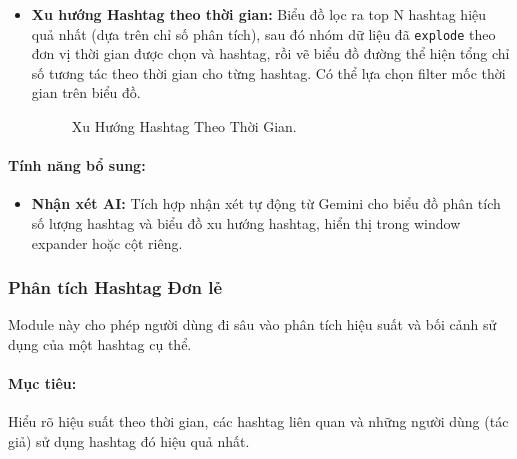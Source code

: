 \begin{itemize}
        \item \textbf{Xu hướng Hashtag theo thời gian:} Biểu đồ lọc ra top N hashtag hiệu quả nhất (dựa trên chỉ số phân tích), sau đó nhóm dữ liệu đã \texttt{explode} theo đơn vị thời gian được chọn và hashtag, rồi vẽ biểu đồ đường thể hiện tổng chỉ số tương tác theo thời gian cho từng hashtag. Có thể lựa chọn filter mốc thời gian trên biểu đồ.
        \begin{figure}[H]
            \centering
            \caption{Xu Hướng Hashtag Theo Thời Gian.}
        \end{figure}
    \end{itemize}

\paragraph{Tính năng bổ sung:}
    \begin{itemize}
        \item \textbf{Nhận xét AI:} Tích hợp nhận xét tự động từ Gemini cho biểu đồ phân tích số lượng hashtag và biểu đồ xu hướng hashtag, hiển thị trong window expander hoặc cột riêng.
    \end{itemize}


\subsubsection{Phân tích Hashtag Đơn lẻ}

Module này cho phép người dùng đi sâu vào phân tích hiệu suất và bối cảnh sử dụng của một hashtag cụ thể.

\paragraph{Mục tiêu:} Hiểu rõ hiệu suất theo thời gian, các hashtag liên quan và những người dùng (tác giả) sử dụng hashtag đó hiệu quả nhất.

